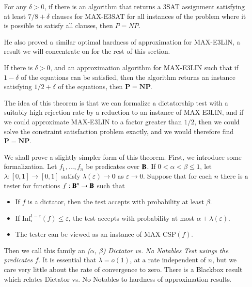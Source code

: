 \begin{theorem}[Hastad]
    For any $\delta > 0$, if there is an algorithm that returns a 3SAT assignment satisfying at least $7/8 + \delta$ clauses for MAX-E3SAT for all instances of the problem where it is possible to satisfy all clauses, then $P = NP$.
\end{theorem}

He also proved a similar optimal hardness of approximation for MAX-E3LIN, a result we will concentrate on for the rest of this section.

\begin{theorem}[Hastad]
    If there is $\delta > 0$, and an approximation algorithm for MAX-E3LIN such that if $1 - \delta$ of the equations can be satisfied, then the algorithm returns an instance satisfying $1/2 + \delta$ of the equations, then $\mathbf{P} = \mathbf{NP}$.
\end{theorem}

The idea of this theorem is that we can formalize a dictatorship test with a suitably high rejection rate by a reduction to an instance of MAX-E3LIN, and if we could approximate MAX-E3LIN to a factor greater than $1/2$, then we could solve the constraint satisfaction problem exactly, and we would therefore find $\mathbf{P} = \mathbf{NP}$.

We shall prove a slightly simpler form of this theorem. First, we introduce some formalization. Let $f_1, \dots, f_n$ be predicates over $\operatorname{\mathbf{B}}$. If $0 < \alpha < \beta \leq 1$, let $\lambda: [0,1] \to [0,1]$ satisfy $\lambda(\varepsilon) \to 0$ as $\varepsilon \to 0$. Suppose that for each $n$ there is a tester for functions $f: \operatorname{\mathbf{B}}^n \to \operatorname{\mathbf{B}}$ such that
%
\begin{itemize}
    \item If $f$ is a dictator, then the test accepts with probability at least $\beta$.
    \item If $\text{Inf}_i^{1 - \varepsilon}(f) \leq \varepsilon$, the test accepts with probability at most $\alpha + \lambda(\varepsilon)$.
    \item The tester can be viewed as an instance of MAX-CSP$(f)$.
\end{itemize}
%
Then we call this family an \emph{($\alpha$, $\beta$) Dictator vs. No Notables Test usings the predicates $f$}. It is essential that $\lambda = o(1)$, at a rate independent of $n$, but we care very little about the rate of convergence to zero. There is a Blackbox result which relates Dictator vs. No Notables to hardness of approximation results.

